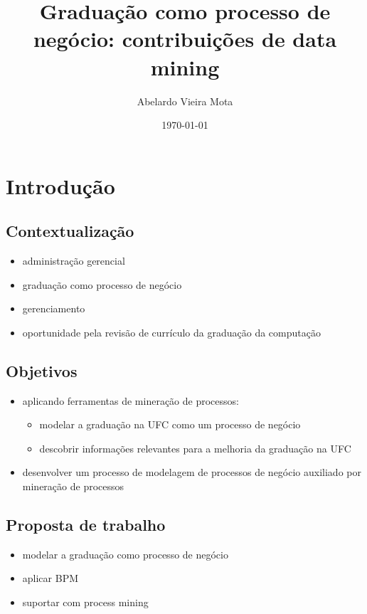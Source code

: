 \documentclass[a4paper]{article}
\title{Graduação como processo de negócio: contribuições de data mining}
\author{Abelardo Vieira Mota}
\date{\today}
\begin{document}
\maketitle

\begin{abstract}
\end{abstract}

\tableofcontents

\section{Introdução}

\subsection{Contextualização}
\begin{itemize}
\item administração gerencial
\item graduação como processo de negócio
\item gerenciamento
\item oportunidade pela revisão de currículo da graduação da computação
\end{itemize}

\subsection{Objetivos}
\begin{itemize}
\item aplicando ferramentas de mineração de processos:
\begin{itemize}
\item modelar a graduação na UFC como um processo de negócio
\item descobrir informações relevantes para a melhoria da graduação na UFC
\end{itemize}
\item desenvolver um processo de modelagem de processos de negócio auxiliado por mineração de processos
\end{itemize}

\subsection{Proposta de trabalho}
\begin{itemize}
\item modelar a graduação como processo de negócio
\item aplicar BPM
\item suportar com process mining
\end{itemize}
\end{document}
